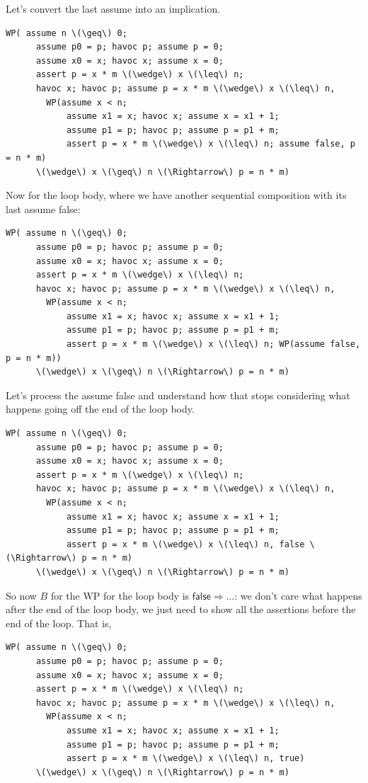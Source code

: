 \documentclass[11pt]{article}
\begin{document}
Let's convert the last \textsf{assume} into an implication.
\begin{Verbatim}[commandchars=\\\{\}]
  WP( assume n \(\geq\) 0;
      assume p0 = p; havoc p; assume p = 0; 
      assume x0 = x; havoc x; assume x = 0; 
      assert p = x * m \(\wedge\) x \(\leq\) n;
      havoc x; havoc p; assume p = x * m \(\wedge\) x \(\leq\) n,
        WP(assume x < n; 
            assume x1 = x; havoc x; assume x = x1 + 1; 
            assume p1 = p; havoc p; assume p = p1 + m; 
            assert p = x * m \(\wedge\) x \(\leq\) n; assume false, p = n * m)
      \(\wedge\) x \(\geq\) n \(\Rightarrow\) p = n * m)
\end{Verbatim}
\newpage
Now for the loop body, where we have another sequential composition with its last \textsf{assume false}:
\begin{Verbatim}[commandchars=\\\{\}]
  WP( assume n \(\geq\) 0;
      assume p0 = p; havoc p; assume p = 0; 
      assume x0 = x; havoc x; assume x = 0; 
      assert p = x * m \(\wedge\) x \(\leq\) n;
      havoc x; havoc p; assume p = x * m \(\wedge\) x \(\leq\) n,
        WP(assume x < n; 
            assume x1 = x; havoc x; assume x = x1 + 1; 
            assume p1 = p; havoc p; assume p = p1 + m; 
            assert p = x * m \(\wedge\) x \(\leq\) n; WP(assume false, p = n * m))
      \(\wedge\) x \(\geq\) n \(\Rightarrow\) p = n * m)
\end{Verbatim}
Let's process the \textsf{assume false} and understand how that stops considering what happens going off the end of the loop body.
\begin{Verbatim}[commandchars=\\\{\}]
  WP( assume n \(\geq\) 0;
      assume p0 = p; havoc p; assume p = 0; 
      assume x0 = x; havoc x; assume x = 0; 
      assert p = x * m \(\wedge\) x \(\leq\) n;
      havoc x; havoc p; assume p = x * m \(\wedge\) x \(\leq\) n,
        WP(assume x < n; 
            assume x1 = x; havoc x; assume x = x1 + 1; 
            assume p1 = p; havoc p; assume p = p1 + m; 
            assert p = x * m \(\wedge\) x \(\leq\) n, false \(\Rightarrow\) p = n * m)
      \(\wedge\) x \(\geq\) n \(\Rightarrow\) p = n * m)
\end{Verbatim}
So now $B$ for the WP for the loop body is $\mathsf{false} \Rightarrow \ldots$: we don't
care what happens after the end of the loop body, we just need to show all the assertions before the end of the loop.
That is,
\begin{Verbatim}[commandchars=\\\{\}]
  WP( assume n \(\geq\) 0;
      assume p0 = p; havoc p; assume p = 0; 
      assume x0 = x; havoc x; assume x = 0; 
      assert p = x * m \(\wedge\) x \(\leq\) n;
      havoc x; havoc p; assume p = x * m \(\wedge\) x \(\leq\) n,
        WP(assume x < n; 
            assume x1 = x; havoc x; assume x = x1 + 1; 
            assume p1 = p; havoc p; assume p = p1 + m; 
            assert p = x * m \(\wedge\) x \(\leq\) n, true)
      \(\wedge\) x \(\geq\) n \(\Rightarrow\) p = n * m)
\end{Verbatim}
\end{document}

